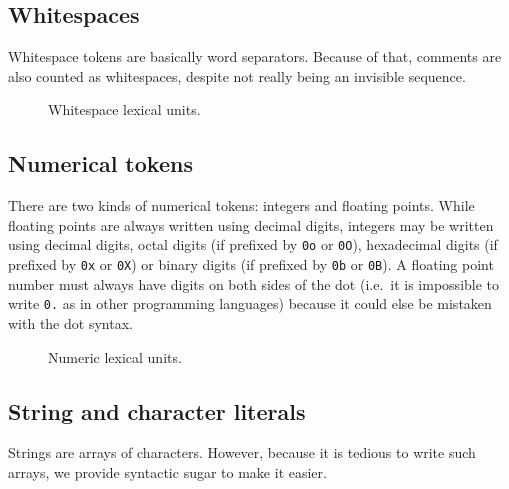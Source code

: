 \subsection{Whitespaces}\label{subsec:zilch-grammar-lexical-whitespaces}

Whitespace tokens are basically word separators.
Because of that, comments are also counted as whitespaces, despite not really being an invisible sequence.

\begin{figure}[H]
	\centering


	\caption{Whitespace lexical units.}
	\label{fig:zilch-grammar-lexical-whitespaces-grammar}
\end{figure}

\subsection{Numerical tokens}\label{subsec:zilch-grammar-lexical-numbers}

There are two kinds of numerical tokens: integers and floating points.
While floating points are always written using decimal digits, integers may be written using decimal digits, octal digits (if prefixed by \verb|0o| or \verb|0O|), hexadecimal digits (if prefixed by \verb|0x| or \verb|0X|) or binary digits (if prefixed by \verb|0b| or \verb|0B|).
A floating point number must always have digits on both sides of the dot (i.e.\ it is impossible to write \verb|0.| as in other programming languages) because it could else be mistaken with the dot syntax.

\begin{figure}[H]
	\centering


	\caption{Numeric lexical units.}
	\label{fig:zilch-grammar-lexical-numbers-grammar}
\end{figure}

\subsection{String and character literals}\label{subsec:zilch-grammar-lexical-strings}

Strings are arrays of characters.
However, because it is tedious to write such arrays, we provide syntactic sugar to make it easier.

